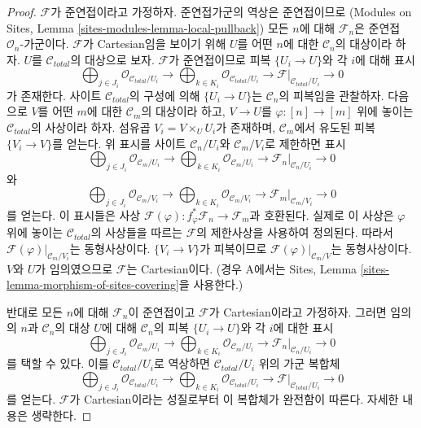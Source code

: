 \begin{proof}
$\mathcal{F}$가 준연접이라고 가정하자.
준연접가군의 역상은 준연접이므로
(Modules on Sites, Lemma \ref{sites-modules-lemma-local-pullback})
모든 $n$에 대해 $\mathcal{F}_n$은 준연접
$\mathcal{O}_n$-가군이다. $\mathcal{F}$가 Cartesian임을 보이기 위해
$U$를 어떤 $n$에 대한 $\mathcal{C}_n$의 대상이라 하자.
$U$를 $\mathcal{C}_{total}$의 대상으로 보자.
$\mathcal{F}$가 준연접이므로 피복 $\{U_i \to U\}$와
각 $i$에 대해 표시
$$
\bigoplus\nolimits_{j \in J_i} \mathcal{O}_{\mathcal{C}_{total}/U_i} \to
\bigoplus\nolimits_{k \in K_i} \mathcal{O}_{\mathcal{C}_{total}/U_i} \to
\mathcal{F}|_{\mathcal{C}_{total}/U_i} \to 0
$$
가 존재한다. 사이트 $\mathcal{C}_{total}$의 구성에 의해
$\{U_i \to U\}$는 $\mathcal{C}_n$의 피복임을 관찰하자.
다음으로 $V$를 어떤 $m$에 대한 $\mathcal{C}_m$의 대상이라 하고,
$V \to U$를 $\varphi : [n] \to [m]$ 위에 놓이는
$\mathcal{C}_{total}$의 사상이라 하자.
섬유곱 $V_i = V \times_U U_i$가 존재하며,
$\mathcal{C}_m$에서 유도된 피복 $\{V_i \to V\}$를 얻는다.
위 표시를 사이트 $\mathcal{C}_n/U_i$와
$\mathcal{C}_m/V_i$로 제한하면 표시
$$
\bigoplus\nolimits_{j \in J_i} \mathcal{O}_{\mathcal{C}_m/U_i} \to
\bigoplus\nolimits_{k \in K_i} \mathcal{O}_{\mathcal{C}_m/U_i} \to
\mathcal{F}_n|_{\mathcal{C}_n/U_i} \to 0
$$
와
$$
\bigoplus\nolimits_{j \in J_i} \mathcal{O}_{\mathcal{C}_m/V_i} \to
\bigoplus\nolimits_{k \in K_i} \mathcal{O}_{\mathcal{C}_m/V_i} \to
\mathcal{F}_m|_{\mathcal{C}_m/V_i} \to 0
$$
를 얻는다. 이 표시들은 사상
$\mathcal{F}(\varphi) : f_\varphi^*\mathcal{F}_n \to \mathcal{F}_m$과
호환된다. 실제로 이 사상은 $\varphi$ 위에 놓이는
$\mathcal{C}_{total}$의 사상들을 따르는 $\mathcal{F}$의 제한사상을
사용하여 정의된다. 따라서
$\mathcal{F}(\varphi)|_{\mathcal{C}_m/V_i}$는 동형사상이다.
$\{V_i \to V\}$가 피복이므로
$\mathcal{F}(\varphi)|_{\mathcal{C}_m/V}$는 동형사상이다.
$V$와 $U$가 임의였으므로 $\mathcal{F}$는 Cartesian이다.
(경우 A에서는 Sites, Lemma
\ref{sites-lemma-morphism-of-sites-covering}을 사용한다.)

\medskip\noindent
반대로 모든 $n$에 대해 $\mathcal{F}_n$이 준연접이고
$\mathcal{F}$가 Cartesian이라고 가정하자.
그러면 임의의 $n$과 $\mathcal{C}_n$의 대상 $U$에 대해
$\mathcal{C}_n$의 피복 $\{U_i \to U\}$와
각 $i$에 대한 표시
$$
\bigoplus\nolimits_{j \in J_i} \mathcal{O}_{\mathcal{C}_m/U_i} \to
\bigoplus\nolimits_{k \in K_i} \mathcal{O}_{\mathcal{C}_m/U_i} \to
\mathcal{F}_n|_{\mathcal{C}_n/U_i} \to 0
$$
를 택할 수 있다. 이를 $\mathcal{C}_{total}/U_i$로 역상하면
$\mathcal{C}_{total}/U_i$ 위의 가군 복합체
$$
\bigoplus\nolimits_{j \in J_i} \mathcal{O}_{\mathcal{C}_{total}/U_i} \to
\bigoplus\nolimits_{k \in K_i} \mathcal{O}_{\mathcal{C}_{total}/U_i} \to
\mathcal{F}|_{\mathcal{C}_{total}/U_i} \to 0
$$
를 얻는다. $\mathcal{F}$가 Cartesian이라는 성질로부터
이 복합체가 완전함이 따른다. 자세한 내용은 생략한다.
\end{proof}

